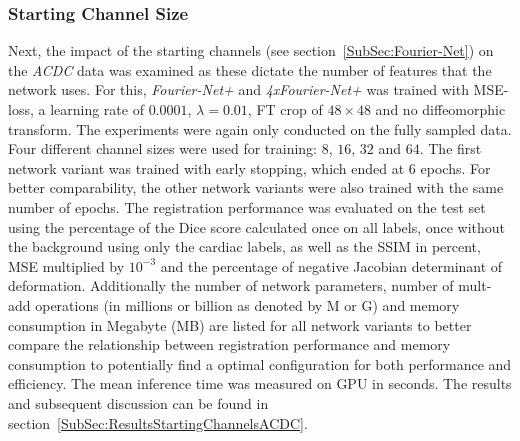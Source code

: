 \subsubsection{Starting Channel Size} \label{SubSubSec:StartingChannelsACDC}
Next, the impact of the starting channels (see section~\ref{SubSec:Fourier-Net}) on the \emph{ACDC} data was examined as these dictate the number of features that the network uses. For this, \emph{Fourier-Net+} and \emph{4xFourier-Net+} was trained with MSE-loss, a learning rate of $0.0001$, $\lambda = 0.01$, FT crop of $48 \times 48$ and no diffeomorphic transform. The experiments were again only conducted on the fully sampled data. Four different channel sizes were used for training: $8$, $16$, $32$ and $64$. The first network variant was trained with early stopping, which ended at 6 epochs. For better comparability, the other network variants were also trained with the same number of epochs. The registration performance was evaluated on the test set using the percentage of the Dice score calculated once on all labels, once without the background using only the cardiac labels, as well as the SSIM in percent, MSE multiplied by $10^{-3}$ and the percentage of negative Jacobian determinant of deformation. Additionally the number of network parameters, number of mult-add operations (in millions or billion as denoted by M or G) and memory consumption in Megabyte (MB) are listed for all network variants to better compare the relationship between registration performance and memory consumption to potentially find a optimal configuration for both performance and efficiency. The mean inference time was measured on GPU in seconds. The results and subsequent discussion can be found in section~\ref{SubSec:ResultsStartingChannelsACDC}.


